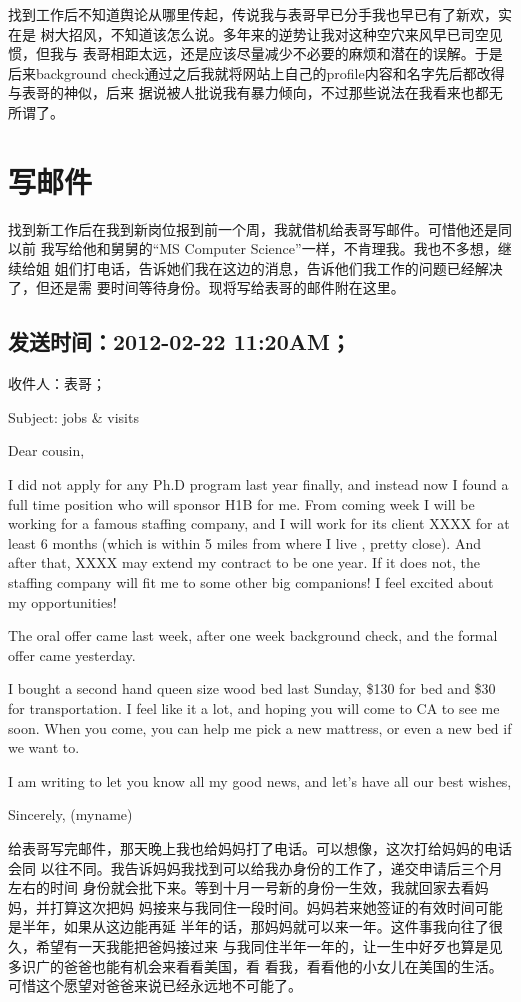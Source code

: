 \documentclass[12pt]{book}
\begin{document}
找到工作后不知道舆论从哪里传起，传说我与表哥早已分手我也早已有了新欢，实在是
树大招风，不知道该怎么说。多年来的逆势让我对这种空穴来风早已司空见惯，但我与
表哥相距太远，还是应该尽量减少不必要的麻烦和潜在的误解。于是后来background 
check通过之后我就将网站上自己的profile内容和名字先后都改得与表哥的神似，后来
据说被人批说我有暴力倾向，不过那些说法在我看来也都无所谓了。
\section{写邮件}
\label{sec-9-47}

找到新工作后在我到新岗位报到前一个周，我就借机给表哥写邮件。可惜他还是同以前
我写给他和舅舅的“MS Computer Science”一样，不肯理我。我也不多想，继续给姐
姐们打电话，告诉她们我在这边的消息，告诉他们我工作的问题已经解决了，但还是需
要时间等待身份。现将写给表哥的邮件附在这里。

\subsection{发送时间：2012-02-22 11:20AM；}
\label{sec-9-47-1}
收件人：表哥；

Subject: jobs \& visits

Dear cousin, 

I did not apply for any Ph.D program last year finally, and instead now I 
found a full time position who will sponsor H1B for me. From coming week I 
will be working for a famous staffing company, and I will work for its 
client XXXX for at least 6 months (which is within 5 miles from where I live
, pretty close). And after that, XXXX may extend my contract to be one year.
If it does not, the staffing company will fit me to some other big 
companions! I feel excited about my opportunities!

The oral offer came last week, after one week background check, and the 
formal offer came yesterday. 

I bought a second hand queen size wood bed last Sunday, \$130 for bed and \$30
for transportation. I feel like it a lot, and hoping you will come to CA to
see me soon. When you come, you can help me pick a new mattress, or even a 
new bed if we want to. 

I am writing to let you know all my good news, and let's have all our best 
wishes, 

Sincerely, (myname)

给表哥写完邮件，那天晚上我也给妈妈打了电话。可以想像，这次打给妈妈的电话会同
以往不同。我告诉妈妈我找到可以给我办身份的工作了，递交申请后三个月左右的时间
身份就会批下来。等到十月一号新的身份一生效，我就回家去看妈妈，并打算这次把妈
妈接来与我同住一段时间。妈妈若来她签证的有效时间可能是半年，如果从这边能再延
半年的话，那妈妈就可以来一年。这件事我向往了很久，希望有一天我能把爸妈接过来
与我同住半年一年的，让一生中好歹也算是见多识广的爸爸也能有机会来看看美国，看
看我，看看他的小女儿在美国的生活。可惜这个愿望对爸爸来说已经永远地不可能了。
\end{document}
